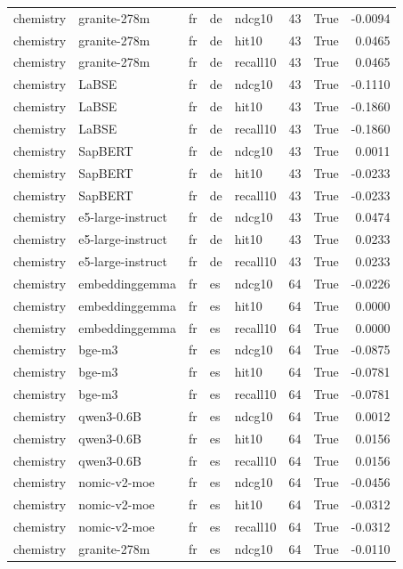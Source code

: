 \begin{tabular}{lllllrrr}
chemistry & granite-278m & fr & de & ndcg10 & 43 & True & -0.0094 \\
chemistry & granite-278m & fr & de & hit10 & 43 & True & 0.0465 \\
chemistry & granite-278m & fr & de & recall10 & 43 & True & 0.0465 \\
chemistry & LaBSE & fr & de & ndcg10 & 43 & True & -0.1110 \\
chemistry & LaBSE & fr & de & hit10 & 43 & True & -0.1860 \\
chemistry & LaBSE & fr & de & recall10 & 43 & True & -0.1860 \\
chemistry & SapBERT & fr & de & ndcg10 & 43 & True & 0.0011 \\
chemistry & SapBERT & fr & de & hit10 & 43 & True & -0.0233 \\
chemistry & SapBERT & fr & de & recall10 & 43 & True & -0.0233 \\
chemistry & e5-large-instruct & fr & de & ndcg10 & 43 & True & 0.0474 \\
chemistry & e5-large-instruct & fr & de & hit10 & 43 & True & 0.0233 \\
chemistry & e5-large-instruct & fr & de & recall10 & 43 & True & 0.0233 \\
chemistry & embeddinggemma & fr & es & ndcg10 & 64 & True & -0.0226 \\
chemistry & embeddinggemma & fr & es & hit10 & 64 & True & 0.0000 \\
chemistry & embeddinggemma & fr & es & recall10 & 64 & True & 0.0000 \\
chemistry & bge-m3 & fr & es & ndcg10 & 64 & True & -0.0875 \\
chemistry & bge-m3 & fr & es & hit10 & 64 & True & -0.0781 \\
chemistry & bge-m3 & fr & es & recall10 & 64 & True & -0.0781 \\
chemistry & qwen3-0.6B & fr & es & ndcg10 & 64 & True & 0.0012 \\
chemistry & qwen3-0.6B & fr & es & hit10 & 64 & True & 0.0156 \\
chemistry & qwen3-0.6B & fr & es & recall10 & 64 & True & 0.0156 \\
chemistry & nomic-v2-moe & fr & es & ndcg10 & 64 & True & -0.0456 \\
chemistry & nomic-v2-moe & fr & es & hit10 & 64 & True & -0.0312 \\
chemistry & nomic-v2-moe & fr & es & recall10 & 64 & True & -0.0312 \\
chemistry & granite-278m & fr & es & ndcg10 & 64 & True & -0.0110 \\

\end{tabular}
